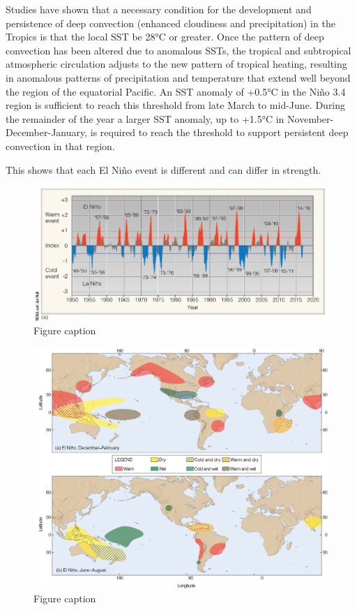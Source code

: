 \documentclass[12pt,oneside]{book}
\begin{document}
Studies have shown that a necessary condition for the development and
persistence of deep convection (enhanced cloudiness and precipitation)
in the Tropics is that the local SST be 28°C or greater. Once the
pattern of deep convection has been altered due to anomalous SSTs, the
tropical and subtropical atmospheric circulation adjusts to the new
pattern of tropical heating, resulting in anomalous patterns of
precipitation and temperature that extend well beyond the region of the
equatorial Pacific. An SST anomaly of +0.5°C in the Niño 3.4 region is
sufficient to reach this threshold from late March to mid-June. During
the remainder of the year a larger SST anomaly, up to +1.5°C in
November-December-January, is required to reach the threshold to support
persistent deep convection in that region.

This shows that each El Niño event is different and can differ in
strength.

\begin{figure}

{\centering \includegraphics[width=0.8\linewidth]{figures/Figure533e} 

}

\caption{Figure caption}\label{fig:Fig533e}
\end{figure}

\begin{figure}

{\centering \includegraphics[width=0.8\linewidth]{figures/Figure533f} 

}

\caption{Figure caption}\label{fig:Fig533f}
\end{figure}
\end{document}
